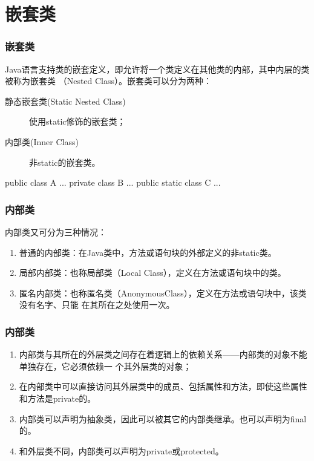 \section{嵌套类}
\begin{frame}[fragile] %
\frametitle{嵌套类}
Java语言支持类的嵌套定义，即允许将一个类定义在其他类的内部，其中内层的类被称为嵌套类
（Nested Class）。嵌套类可以分为两种：
\begin{description}
\item[静态嵌套类(Static Nested Class)] 使用static修饰的嵌套类；
\item[内部类(Inner Class)] 非static的嵌套类。
\end{description}
\begin{javaCode}
public class A {
  ...
  private class B {
    ...
  }
  public static class C {
    ...
  }
}
\end{javaCode}
\end{frame}

\begin{frame}[fragile] %
\frametitle{内部类}
内部类又可分为三种情况：
\begin{enumerate}
\item {\hei 普通的内部类：}在Java类中，方法或语句块的外部定义的非static类。
\item {\hei 局部内部类：}也称局部类（Local Class），定义在方法或语句块中的类。
\item {\hei 匿名内部类：}也称匿名类（AnonymousClass），定义在方法或语句块中，该类没有名字、只能
  在其所在之处使用一次。
\end{enumerate}
\end{frame}

\begin{frame}[fragile] %
\frametitle{内部类}
\begin{enumerate}
\item 内部类与其所在的外层类之间存在着逻辑上的依赖关系——内部类的对象不能单独存在，它必须依赖一
个其外层类的对象；
\item 在内部类中可以直接访问其外层类中的成员、包括属性和方法，即使这些属性和方法是private的。
\item 内部类可以声明为抽象类，因此可以被其它的内部类继承。也可以声明为final的。
\item 和外层类不同，内部类可以声明为private或protected。
\end{enumerate}
\end{frame}

